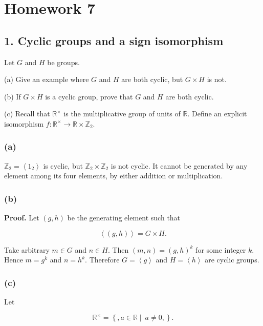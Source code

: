 \chapter{Homework 7}

\section{1. Cyclic groups and a sign isomorphism}

Let \(G\) and \(H\) be groups.

(a) Give an example where \(G\) and \(H\) are both cyclic, but \(G \times H\) is not.

(b) If \(G \times H\) is a cyclic group, prove that \(G\) and \(H\) are both cyclic.

(c) Recall that \(\mathbb{R}^{\times}\) is the multiplicative group of units of \(\mathbb{R}\). Define an explicit isomorphism \(f:\mathbb{R}^{\times}\rightarrow\mathbb{R} \times \mathbb{Z}_{2}\).

\subsection{(a)}

\(\mathbb{Z}_{2} = \left\langle 1_{2} \right\rangle\) is cyclic, but \(\mathbb{Z}_{2} \times \mathbb{Z}_{2}\) is not cyclic. It cannot be generated by any element among its four elements, by either addition or multiplication.

\subsection{(b)}

\textbf{Proof.} Let \(\left( {g,h} \right)\) be the generating element such that

\[\left\langle \left( {g,h} \right) \right\rangle = G \times H.\]

Take arbitrary \(m \in G\) and \(n \in H\). Then \(\left( {m,n} \right) = \left( {g,h} \right)^{k}\) for some integer \(k\). Hence \(m = g^{k}\) and \(n = h^{k}\). Therefore \(G = \left\langle g \right\rangle\) and \(H = \left\langle h \right\rangle\) are cyclic groups.

\subsection{(c)}

Let

\[\mathbb{R}^{\times} = \left\{ ,a \in \mathbb{R} \middle| \ a \neq 0, \right\}.\]

